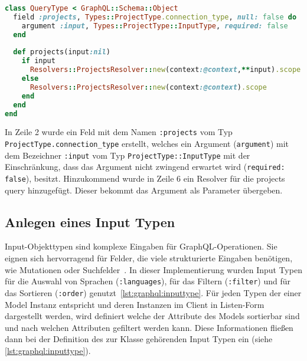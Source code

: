 \begin{lstlisting}[language=Ruby,float=h!,caption={Definition des QueryType als Einstiegspunkt in alle Queries}, label={lst:graphql:querytype}]
class QueryType < GraphQL::Schema::Object
  field :projects, Types::ProjectType.connection_type, null: false do
    argument :input, Types::ProjectType::InputType, required: false
  end
  
  def projects(input:nil)
    if input
      Resolvers::ProjectsResolver::new(context:@context,**input).scope
    else
      Resolvers::ProjectsResolver::new(context:@context).scope
    end
  end
end
\end{lstlisting}

In Zeile 2 wurde ein Feld mit dem Namen \lstinline|:projects| vom Typ \lstinline|ProjectType.connection_type| erstellt, welches ein Argument (\lstinline|argument|) mit dem Bezeichner \lstinline|:input| vom Typ \lstinline|ProjectType::InputType| mit der Einschränkung, dass das Argument nicht zwingend erwartet wird (\lstinline|required: false|), besitzt.
Hinzukommend wurde in Zeile 6 ein Resolver für die projects query hinzugefügt. Dieser bekommt das Argument als Parameter übergeben.

\subsection{Anlegen eines Input Typen}
\label{graphql:inputtypes}
Input-Objekttypen sind komplexe Eingaben für GraphQL-Operationen. Sie eignen sich hervorragend für Felder, die viele strukturierte Eingaben benötigen, wie Mutationen oder Suchfelder~\cite{graphql-input-type}.
In dieser Implementierung wurden Input Typen für die Auswahl von Sprachen (\lstinline|:languages|), für das Filtern (\lstinline|:filter|) und für das Sortieren (\lstinline|:order|) genutzt~\ref{lst:graphql:inputtype}.
Für jeden Typen der einer Model Instanz entspricht und deren Instanzen im Client in Listen-Form dargestellt werden, wird definiert welche der Attribute des Models sortierbar sind und nach welchen Attributen gefiltert werden kann. Diese Informationen fließen dann bei der Definition des zur Klasse gehörenden Input Typen ein (siehe \ref{lst:graphql:inputtype}).

